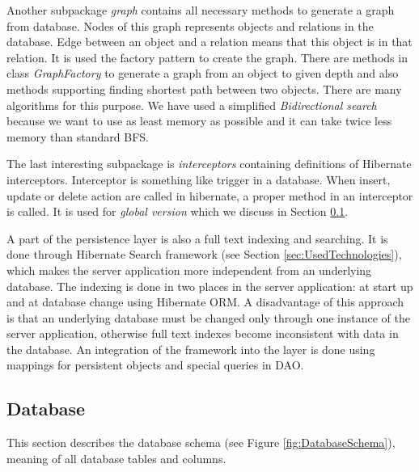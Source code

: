 Another subpackage \emph{graph} contains all necessary methods to generate a
graph from database. Nodes of this graph represents objects and relations in
the database. Edge between an object and a relation means that this object is in
that relation. It is used the factory pattern to create the graph. There are
methods in class \emph{GraphFactory} to generate a graph from an object to given
depth and also methods supporting finding shortest path between two objects.	
There are many algorithms for this purpose. We have
used a simplified \emph{Bidirectional search} because we want to use as least memory as
possible and it can take twice less memory than standard BFS.

The last interesting subpackage is \emph{interceptors} containing definitions
of Hibernate interceptors. Interceptor is something like trigger in a database.
When insert, update or delete action are called in hibernate, a proper method
in an interceptor is called. It is used for \emph{global version} which we
discuss in Section \ref{sec:Database}.

A part of the persistence layer is also a full text indexing and searching. It is
done through Hibernate Search framework (see Section \ref{sec:UsedTechnologies}),
which makes the server application more independent from an underlying database.
The indexing is done in two places in the server application: at start up and at
database change using Hibernate ORM. A disadvantage of this approach is that
an underlying database must be changed only through one instance of the server
application, otherwise full text indexes become inconsistent with data in the database.
An integration of the framework into the layer is done using mappings for persistent
objects and special queries in DAO.

\subsection{Database}
\label{sec:Database}

This section describes the database schema (see Figure \ref{fig:DatabaseSchema}),
meaning of all database tables and columns.

